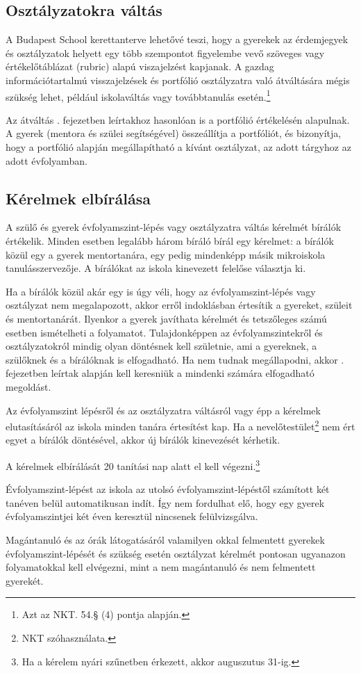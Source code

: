 \subsection{Osztályzatokra váltás}
\label{sec:osztalyzatok}
A Budapest School kerettanterve lehetővé teszi, hogy a gyerekek az érdemjegyek
és osztályzatok
helyett egy több szempontot figyelembe vevő szöveges vagy értékelőtáblázat
(rubric) alapú viszajelzést kapjanak.
A gazdag információtartalmú visszajelzések és portfólió osztályzatra való
átváltására mégis szükség lehet, például iskolaváltás vagy továbbtanulás
esetén.\footnote{Azt az NKT. 54.§ (4) pontja alapján.}

Az átváltás .
fejezetben leírtakhoz
hasonlóan is a portfólió értékelésén alapulnak.
A gyerek (mentora és szülei segítségével) összeállítja a portfóliót, és
bizonyítja, hogy a portfólió alapján megállapítható a kívánt osztályzat, az
adott tárgyhoz az adott évfolyamban.

\subsection{Kérelmek elbírálása}

A szülő és gyerek évfolyamszint-lépés vagy osztályzatra váltás kérelmét bírálók
értékelik. Minden esetben legalább három bíráló bírál egy kérelmet: a
bírálók közül egy a gyerek mentortanára, egy pedig mindenképp másik mikroiskola
tanulásszervezője. A bírálókat az iskola kinevezett felelőse választja ki.

Ha a bírálók közül akár egy is úgy véli, hogy az évfolyamszint-lépés vagy
osztályzat nem megalapozott, akkor
erről indoklásban értesítik a gyereket, szüleit és mentortanárát. Ilyenkor a
gyerek javíthata kérelmét és tetszőleges számú esetben ismételheti a
folyamatot. Tulajdonképpen az évfolyamszintekről és osztályzatokról mindig
olyan döntésnek kell születnie, ami a gyereknek, a szülőknek és a bírálóknak is
elfogadható. Ha nem tudnak megállapodni, akkor
. fejezetben leírtak alapján kell keresniük a
mindenki számára elfogadható megoldást.

Az évfolyamszint lépésről és az osztályzatra váltásról vagy épp a kérelmek
elutasításáról az iskola minden tanára értesítést kap. Ha a
nevelőtestület\footnote{NKT szóhasználata.}
nem ért egyet a bírálók döntésével, akkor új bírálók kinevezését kérhetik.

A kérelmek elbírálását 20 tanítási nap alatt el kell végezni.\footnote{Ha a
    kérelem nyári szűnetben érkezett, akkor auguszutus 31-ig.}

Évfolyamszint-lépést az iskola az utolsó évfolyamszint-lépéstől számított két
tanéven belül automatikusan indít. Így nem fordulhat elő, hogy egy gyerek
évfolyamszintjei két éven keresztül nincsenek felülvizsgálva.

Magántanuló és az órák látogatásáról valamilyen okkal felmentett gyerekek
évfolyamszint-lépését és szükség esetén osztályzat kérelmét pontosan ugyanazon
folyamatokkal kell elvégezni, mint a nem magántanuló és nem felmentett
gyerekét.
